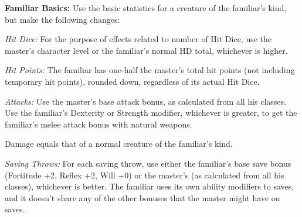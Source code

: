 

\textbf{Familiar Basics:} Use the basic statistics for a creature of the familiar's kind, but make the following changes:

\textit{Hit Dice:} For the purpose of effects related to number of Hit Dice, use the master's character level or the familiar's normal HD total, whichever is higher.

\textit{Hit Points:} The familiar has one-half the master's total hit points (not including temporary hit points), rounded down, regardless of its actual Hit Dice.

\textit{Attacks:} Use the master's base attack bonus, as calculated from all his classes. Use the familiar's Dexterity or Strength modifier, whichever is greater, to get the familiar's melee attack bonus with natural weapons.

Damage equals that of a normal creature of the familiar's kind.

\textit{Saving Throws:} For each saving throw, use either the familiar's base save bonus (Fortitude +2, Reflex +2, Will +0) or the master's (as calculated from all his classes), whichever is better. The familiar uses its own ability modifiers to saves, and it doesn't share any of the other bonuses that the master might have on saves.

